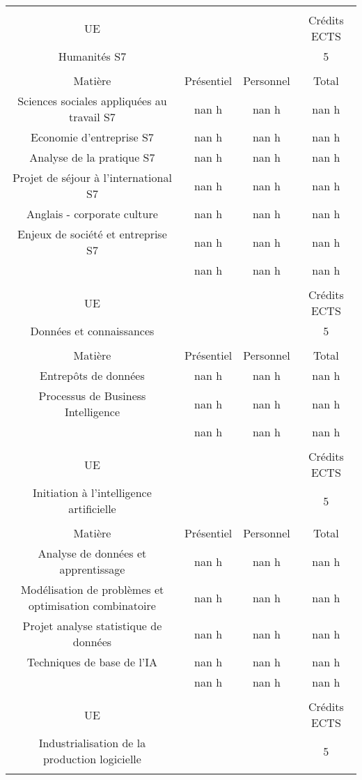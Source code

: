 \begin{longtable}{c c c c}%
&&&\\%
UE&&&Crédits ECTS\\%
Humanités S7&&&5\\%
&&&\\%
Matière&Présentiel&Personnel&Total\\%
Sciences sociales appliquées au travail S7&nan h&nan h&nan h\\%
Economie d'entreprise S7&nan h&nan h&nan h\\%
Analyse de la pratique S7&nan h&nan h&nan h\\%
Projet de séjour à l'international S7&nan h&nan h&nan h\\%
Anglais {-} corporate culture &nan h&nan h&nan h\\%
Enjeux de société et entreprise S7&nan h&nan h&nan h\\%
\hline%
&nan h&nan h&nan h\\%
\hline%
&&&\\%
UE&&&Crédits ECTS\\%
Données et connaissances&&&5\\%
&&&\\%
Matière&Présentiel&Personnel&Total\\%
Entrepôts de données&nan h&nan h&nan h\\%
Processus de Business Intelligence&nan h&nan h&nan h\\%
\hline%
&nan h&nan h&nan h\\%
\hline%
&&&\\%
UE&&&Crédits ECTS\\%
Initiation à l'intelligence artificielle&&&5\\%
&&&\\%
Matière&Présentiel&Personnel&Total\\%
Analyse de données et apprentissage&nan h&nan h&nan h\\%
Modélisation de problèmes et optimisation combinatoire&nan h&nan h&nan h\\%
Projet analyse statistique de données&nan h&nan h&nan h\\%
Techniques de base de l'IA&nan h&nan h&nan h\\%
\hline%
&nan h&nan h&nan h\\%
\hline%
&&&\\%
UE&&&Crédits ECTS\\%
Industrialisation de la production logicielle&&&5\\%
&&&\\%

\end{longtable}
